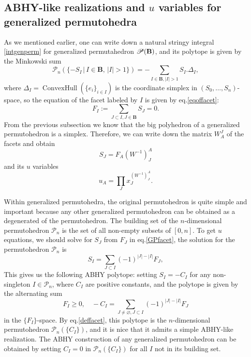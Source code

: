 \documentclass[hidelinks,12pt]{article}
\begin{document}
\subsection{ABHY-like realizations and $u$ variables for generalized permutohedra}

As we mentioned earlier, one can write down a natural stringy integral \eqref{intgenperm} for generalized permutahedron $\mathscr{P}(\bf B)$,
and its polytope is given by the Minkowski sum
\[
	\mathscr P_n(\{-S_I\,|\,I\in \mathbf B,\,|I|>1\}) =- \sum_{I\in\mathbf{B},|I|>1}S_I.\Delta_I,
\]
where $\Delta_I=\operatorname{ConvexHull}
(\{e_i\}_{i\in I})$ is the coordinate simplex in $(S_0,\dots,S_n)$-space, so the equation of the facet labeled by $I$ is given by eq.\eqref{eqoffacet}:
\begin{equation}\label{GPfacet}
	F_I:=\sum_{J\subset I,J\in\mathbf{B}}S_J=0.
\end{equation}
From the previous subsection we know that the big polyhedron of a generalized permutohedron is a simplex.
Therefore, we can write down the matrix $W^J_A$ of the facets and obtain  
\[
S_J=F_A(W^{-1})^A_J
\]
and 
its $u$ variables 
\[ u_A=\prod_J x_J^{(W^{-1})^A_J}. \] 

Within generalized permutohedra, the original permutohedron is quite simple and important because any other generalized permutohedron can be obtained as a degenerated of the permutohedron.
The building set of the $n$-dimensional permutohedron $\mathscr P_n$ is 
the set of all non-empty subsets of $[0,n]$. 
To get $u$ equations, we should solve for $S_J$ from $F_J$ in eq.\eqref{GPfacet}, the 
solution for the permutohedron $\mathscr P_n$ is 
\begin{equation}\label{SinF}
	S_I=\sum_{J\subset I} (-1)^{|J|-|I|}F_J,
\end{equation}
This gives us the following ABHY polytope:
setting 
$S_I=-C_I$ for any non-singleton $I\in \mathscr P_n$, where $C_I$ are positive 
constants, and the polytope is given by the alternating sum
\begin{equation}\label{ABHY}
	F_I\geq 0,\quad -C_I=\sum_{J\neq \varnothing,J\subset I}(-1)^{|J|-|I|}F_J
\end{equation}
in the $\{F_I\}$-space.
By eq.\eqref{deffacet}, this polytope is the $n$-dimensional 
permutohedron $\mathscr P_n(\{C_I\})$, and it is nice that it admits a simple ABHY-like realization.
The ABHY construction of any generalized permutohedron can be obtained by 
setting $C_I=0$ in $\mathscr P_n(\{C_I\})$ for all $I$ not in its building set.
\end{document}
